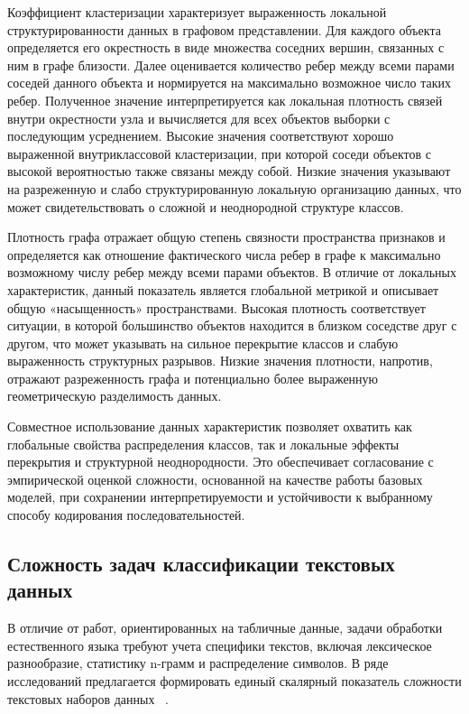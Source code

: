 \documentclass[specification,annotation,times]{itmo-student-thesis}
\begin{document}
Коэффициент кластеризации характеризует выраженность локальной структурированности данных в графовом представлении. Для каждого объекта определяется его окрестность в виде множества соседних вершин, связанных с ним в графе близости. Далее оценивается количество ребер между всеми парами соседей данного объекта и нормируется на максимально возможное число таких ребер. Полученное значение интерпретируется как локальная плотность связей внутри окрестности узла и вычисляется для всех объектов выборки с последующим усреднением. Высокие значения соответствуют хорошо выраженной внутриклассовой кластеризации, при которой соседи объектов с высокой вероятностью также связаны между собой. Низкие значения указывают на разреженную и слабо структурированную локальную организацию данных, что может свидетельствовать о сложной и неоднородной структуре классов.

Плотность графа отражает общую степень связности пространства признаков и определяется как отношение фактического числа ребер в графе к максимально возможному числу ребер между всеми парами объектов. В отличие от локальных характеристик, данный показатель является глобальной метрикой и описывает общую «насыщенность» пространствами. Высокая плотность соответствует ситуации, в которой большинство объектов находится в близком соседстве друг с другом, что может указывать на сильное перекрытие классов и слабую выраженность структурных разрывов. Низкие значения плотности, напротив, отражают разреженность графа и потенциально более выраженную геометрическую разделимость данных. 

Совместное использование данных характеристик позволяет охватить как глобальные свойства распределения классов, так и локальные эффекты перекрытия и структурной неоднородности. Это обеспечивает согласование с эмпирической оценкой сложности, основанной на качестве работы базовых моделей, при сохранении интерпретируемости и устойчивости к выбранному способу кодирования последовательностей.

\subsection{Сложность задач классификации текстовых данных}


В отличие от работ, ориентированных на табличные данные, задачи обработки естественного языка требуют учета специфики текстов, включая лексическое разнообразие, статистику n-грамм и распределение символов. В ряде исследований предлагается формировать единый скалярный показатель сложности текстовых наборов данных ~\cite{collins2018evolutionary}.
\end{document}
